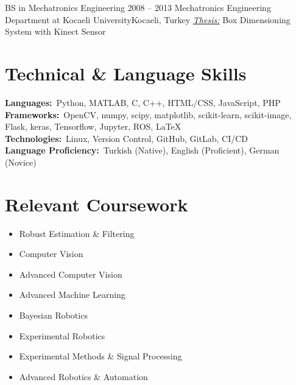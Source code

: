 \documentclass[letterpaper,11pt]{article}
\begin{document}
	  \resumeSubheading
      {BS in Mechatronics Engineering}
	  {2008 -- 2013}
      {Mechatronics Engineering Department at Kocaeli University}{Kocaeli, Turkey}
	  \textit{\underline{Thesis:}} Box Dimensioning System with Kinect Sensor
  \resumeSubHeadingListEnd

\section{Technical \& Language Skills}
 \begin{itemize}[leftmargin=0.15in, label={}]
    \small{\item{
     \textbf{Languages:}{~Python, MATLAB, C, C++, HTML/CSS, JavaScript, PHP} \\
	 \textbf{Frameworks:}{~OpenCV, numpy, scipy, matplotlib, scikit-learn, scikit-image, Flask, keras, Tensorflow, Jupyter, ROS, \LaTeX} \\
     \textbf{Technologies:}{~Linux, Version Control, GitHub, GitLab, CI/CD} \\
	 \textbf{Language Proficiency:}{~Turkish (Native), English (Proficient), German (Novice)}
    }}
 \end{itemize}
 \vspace{-16pt}

%
\section{Relevant Coursework}
	\begin{multicols}{3}
		\begin{itemize}[itemsep=-5pt, parsep=3pt]
			\item\small Robust Estimation \& Filtering
			\item Computer Vision
			\item Advanced Computer Vision
			\item Advanced Machine Learning
			\item Bayesian Robotics
			\item Experimental Robotics
			\item Experimental Methods \& Signal Processing
			\item Advanced Robotics \& Automation
		\end{itemize}
	\end{multicols}
	\vspace*{2.0\multicolsep}
\end{document}

